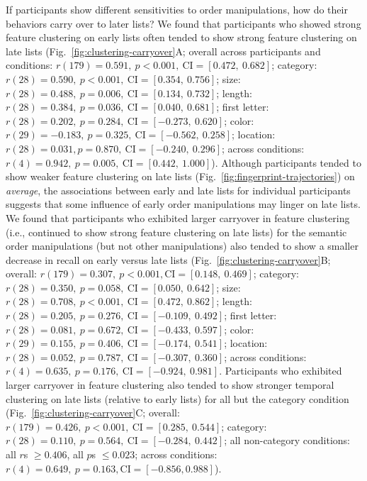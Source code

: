 \documentclass[11pt]{article}
\begin{document}
If participants show different sensitivities to order manipulations, how do
their behaviors carry over to later lists? We found that participants who
showed strong feature clustering on early lists often tended to show strong
feature clustering on late lists (Fig.~\ref{fig:clustering-carryover}A; overall
across participants and conditions: $r(179) = 0.591,~p < 0.001,~\mathrm{CI} =
[0.472,~0.682]$; category: $r(28) = 0.590,~p < 0.001,~\mathrm{CI} = [0.354,~
0.756]$; size: $r(28) = 0.488,~p = 0.006,~\mathrm{CI} = [0.134,~0.732]$;
length: $r(28) = 0.384,~p = 0.036,~\mathrm{CI} = [0.040,~0.681]$; first letter:
$r(28) = 0.202,~p = 0.284,~\mathrm{CI} = [-0.273,~0.620]$; color: $r(29) =
-0.183,~p = 0.325,~\mathrm{CI} = [-0.562,~0.258]$; location: $r(28) = 0.031, p
= 0.870,~\mathrm{CI} = [-0.240,~0.296]$; across conditions: $r(4) = 0.942,~p =
0.005,~\mathrm{CI} = [0.442,~1.000]$). Although participants tended to show
weaker feature clustering on late lists
(Fig.~\ref{fig:fingerprint-trajectories}) on \textit{average}, the associations
between early and late lists for individual participants suggests that some
influence of early order manipulations may linger on late lists. We found that
participants who exhibited larger carryover in feature clustering (i.e.,
continued to show strong feature clustering on late lists) for the semantic
order manipulations (but not other manipulations) also tended to show a smaller
decrease in recall on early versus late lists
(Fig.~\ref{fig:clustering-carryover}B; overall: $r(179) = 0.307,~p < 0.001,
\mathrm{CI} = [0.148,~0.469]$; category: $r(28) = 0.350,~p = 0.058,~\mathrm{CI}
= [0.050,~0.642]$; size: $r(28) = 0.708,~p < 0.001,~\mathrm{CI} = [0.472,~
0.862]$; length: $r(28) = 0.205,~p = 0.276,~\mathrm{CI} = [-0.109,~0.492]$;
first letter: $r(28) = 0.081,~p = 0.672,~\mathrm{CI} = [-0.433,~0.597]$; color:
$r(29) = 0.155,~p = 0.406,~\mathrm{CI} = [-0.174,~0.541]$; location: $r(28) =
0.052,~p = 0.787,~\mathrm{CI} = [-0.307,~0.360]$; across conditions: $r(4) =
0.635,~p = 0.176,~\mathrm{CI} = [-0.924,~0.981]$. Participants who exhibited
larger carryover in feature clustering also tended to show stronger temporal
clustering on late lists (relative to early lists) for all but the category
condition (Fig.~\ref{fig:clustering-carryover}C; overall: $r(179) = 0.426,~p <
0.001,~\mathrm{CI} = [0.285,~0.544]$; category: $r(28) = 0.110,~p = 0.564,~
\mathrm{CI} = [-0.284,~0.442]$; all non-category conditions: all $r$s $\geq
0.406$, all $p$s $\leq 0.023$; across conditions: $r(4) = 0.649,~p = 0.163,
\mathrm{CI} = [-0.856, 0.988]$).
\end{document}
